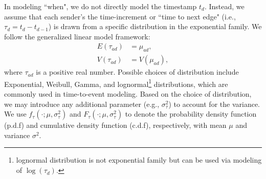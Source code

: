 \documentclass[12pt]{article}
\begin{document}
In modeling ``when", we do not directly model the timestamp $t_d$. Instead, we assume that each sender's the time-increment or ``time to next edge" (i.e., $\tau_{d} = t_d-t_{d-1}$) is drawn from a specific distribution in the exponential family.  We follow the generalized linear model framework:
\begin{equation}
\begin{aligned}
E(\tau_{ad}) &= \mu_{ad},\\
V(\tau_{ad}) &= V(\mu_{ad}),
\end{aligned}
\end{equation}
where $\tau_{ad}$ is a positive real number. Possible choices of distribution include Exponential, Weibull, Gamma, and lognormal\footnote{lognormal distribution is not exponential family but can be used via modeling of $\log(\tau_d)$.} distributions, which are commonly used in time-to-event modeling. Based on the choice of distribution, we may introduce any additional parameter (e.g., $\sigma_\tau^2$) to account for the variance. We use $f_\tau(\cdot; \mu, \sigma_\tau^2)$ and $F_\tau(\cdot; \mu, \sigma_\tau^2)$ to denote the probability density function (p.d.f) and cumulative density function (c.d.f), respectively, with mean $\mu$ and variance $\sigma^2$.
\end{document}
